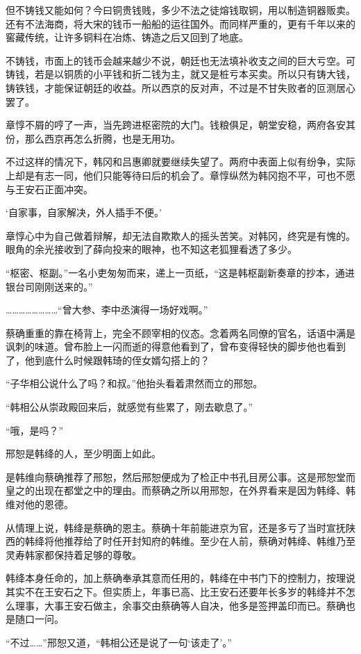 但不铸钱又能如何？今曰铜贵钱贱，多少不法之徒熔钱取铜，用以制造铜器贩卖。还有不法海商，将大宋的钱币一船船的运往国外。而同样严重的，更有千年以来的窖藏传统，让许多铜料在冶炼、铸造之后又回到了地底。

不铸钱，市面上的钱币会越来越少不说，朝廷也无法填补收支之间的巨大亏空。可铸钱，若是以铜质的小平钱和折二钱为主，就又是桩亏本买卖。所以只有铸大钱，铸铁钱，才能保证朝廷的收益。所以西京的反对声，不过是不甘失败者的叵测居心罢了。

章惇不屑的哼了一声，当先跨进枢密院的大门。钱粮俱足，朝堂安稳，两府各安其份，那么西京再怎么折腾，也是无用功。

不过这样的情况下，韩冈和吕惠卿就要继续失望了。两府中表面上似有纷争，实际上却是有志一同，他们只能等待曰后的机会了。章惇纵然为韩冈抱不平，可也不愿与王安石正面冲突。

‘自家事，自家解决，外人插手不便。’

章惇心中为自己做着辩解，却无法自欺欺人的摇头苦笑。对韩冈，终究是有愧的。眼角的余光接收到了薛向投来的眼神，也不知这老狐狸看透了多少。

“枢密、枢副。”一名小吏匆匆而来，递上一页纸，“这是韩枢副新奏章的抄本，通进银台司刚刚送来的。”

……………………“曾大参、李中丞演得一场好戏啊。”

蔡确重重的靠在椅背上，完全不顾宰相的仪态。念着两名同僚的官名，话语中满是讽刺的味道。曾布脸上一闪而逝的得意他看到了，曾布变得轻快的脚步他也看到了，他到底什么时候跟韩琦的侄女婿勾搭上的？

“子华相公说什么了吗？和叔。”他抬头看着肃然而立的邢恕。

“韩相公从崇政殿回来后，就感觉有些累了，刚去歇息了。”

“哦，是吗？”

邢恕是韩绛的人，至少明面上如此。

是韩维向蔡确推荐了邢恕，然后邢恕便成为了检正中书孔目房公事。这是邢恕堂而皇之的出现在都堂之中的理由。而蔡确之所以用邢恕，在外界看来是因为韩绛、韩维对他的恩德。

从情理上说，韩绛是蔡确的恩主。蔡确十年前能进京为官，还是多亏了当时宣抚陕西的韩绛将他推荐给了时任开封知府的韩维。至少在人前，蔡确对韩绛、韩维乃至灵寿韩家都保持着足够的尊敬。

韩绛本身任命的，加上蔡确奉承其意而任用的，韩绛在中书门下的控制力，按理说其实不在王安石之下。但实质上，年事已高、比王安石还要年长多岁的韩绛并不怎么理事，大事王安石做主，余事交由蔡确等人自决，他多是签押盖印而已。蔡确也是随口一问。

“不过……”邢恕又道，“韩相公还是说了一句‘该走了’。”

